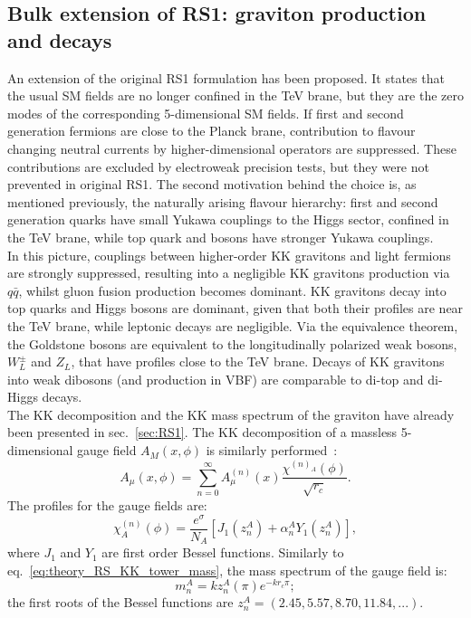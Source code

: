 \subsection{Bulk extension of RS1: graviton production and decays}
An extension of the original RS1 formulation has been proposed. It states that the usual SM fields are no longer confined in the TeV brane, but they are the zero modes of the corresponding 5-dimensional SM fields. If first and second generation fermions are close to the Planck brane, contribution to flavour changing neutral currents by higher-dimensional operators are suppressed. These contributions are excluded by electroweak precision tests, but they were not prevented in original RS1. The second motivation behind the choice is, as mentioned previously, the naturally arising flavour hierarchy: first and second generation quarks have small Yukawa couplings to the Higgs sector, confined in the TeV brane, while top quark and bosons have stronger Yukawa couplings.\\
In this picture, couplings between higher-order KK gravitons and light fermions are strongly suppressed, resulting into a negligible KK gravitons production via $q \bar{q}$, whilst gluon fusion production becomes dominant. KK gravitons decay into top quarks and Higgs bosons are dominant, given that both their profiles are near the TeV brane, while leptonic decays are negligible. Via the equivalence theorem, the Goldstone bosons are equivalent to the longitudinally polarized weak bosons, $W_L^{\pm}$ and $Z_L$, that have profiles close to the TeV brane. Decays of KK gravitons into weak dibosons (and production in VBF) are comparable to di-top and di-Higgs decays.\\

The KK decomposition and the KK mass spectrum of the graviton have already been presented in sec.~\ref{sec:RS1}. The KK decomposition of a massless 5-dimensional gauge field $A_M(x, \phi)$ is similarly performed~\cite{Davoudiasl:2000wi}:
\begin{equation}
A_{\mu}(x, \phi) = \sum_{n=0}^{\infty} A_{\mu}^{(n)}(x) \frac{\chi^{(n)_A}(\phi)}{\sqrt{r_c}}.
\label{eq:theory_gauge_KK_tower}
\end{equation}
The profiles for the gauge fields are:
\begin{equation}
\chi^{(n)}_A(\phi) = \frac{e^{\sigma}}{N_A} \left[ J_1(z_n^A) + \alpha_n^A Y_1(z_n^A) \right],
\label{eq:theory_gauge_KK_tower_profile}
\end{equation}
where $J_1$ and $Y_1$ are first order Bessel functions. Similarly to eq.~\ref{eq:theory_RS_KK_tower_mass}, the mass spectrum of the gauge field is:
\begin{equation}
m_n^A = k z_n^A(\pi) e^{-k r_c \pi};
\label{eq:theory_RS_KK_tower_mass}
\end{equation}
the first roots of the Bessel functions are $z_n^A = \left( 2.45, 5.57, 8.70, 11.84, ... \right)$.

